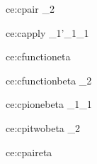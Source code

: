 \documentclass{article}
\theoremstyle{break}
\begin{document}
  {ce:cpair}
  {\qquad
       {\kind_2}}
  {\equivconstructor{\context}
     {}
     {}
     {}}

  {ce:capply}
  {
                    {}\qquad
   \equivconstructor{\context}
                    {\constructor_1}{\constructor'_1}{\kind_1}}
  {\equivconstructor{\context}
     {}
     {}
     {}}

  {ce:cfunctioneta}
  {\validconstructor{\context}{\constructor}
     {}}
  {\equivconstructor{\context}
     {}
     {\constructor}{}}

  {ce:cfunctionbeta}
  {\validconstructor{\context}
     {}
     {}\qquad
   }
  {\equivconstructor{\context}
     {
             {\constructor_2}}
     {}
     {}}

  {ce:cpionebeta}
  {
     {}}
  {\equivconstructor{\context}
     {}
     {\constructor_1}{\kind_1}}

  {ce:cpitwobeta}
  {
     {}}
  {\equivconstructor{\context}
     {}
     {\constructor_2}{}}

  {ce:cpaireta}
  {}
  {\equivconstructor{\context}
     {\constructor}
     {}
     {}}
\end{document}
